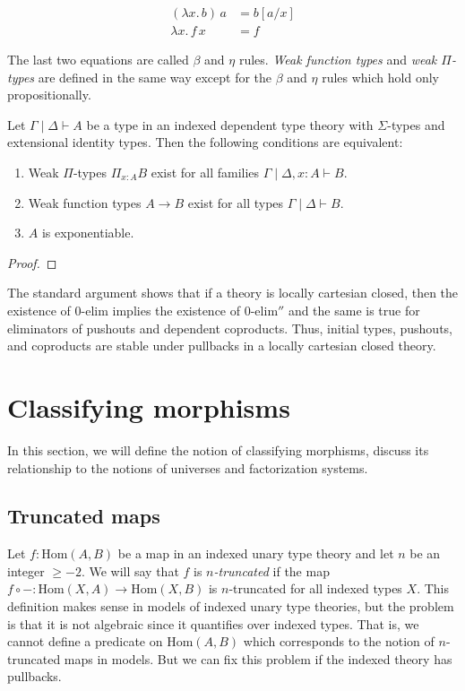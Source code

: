 \documentclass[reqno]{amsart}
\theoremstyle{definition}
\theoremstyle{remark}
\newcommand{\ob}{}
\newcommand{\fs}[1]{\mathrm{#1}}
\newcommand{\Hom}{\fs{Hom}}
\numberwithin{figure}{section}
\begin{document}
\begin{align*}
(\lambda x.\,b)\,a & = b[a/x] \\
\lambda x.\,f\,x & = f
\end{align*}

The last two equations are called $\beta$ and $\eta$ rules.
\emph{Weak function types} and \emph{weak $\Pi$-types} are defined in the same way except for the $\beta$ and $\eta$ rules which hold only propositionally.

\begin{prop}
Let $\Gamma \mid \Delta \vdash A \ob$ be a type in an indexed dependent type theory with $\Sigma$-types and extensional identity types.
Then the following conditions are equivalent:
\begin{enumerate}
\item Weak $\Pi$-types $\Pi_{x : A} B$ exist for all families $\Gamma \mid \Delta, x : A \vdash B \ob$.
\item Weak function types $A \to B$ exist for all types $\Gamma \mid \Delta \vdash B \ob$.
\item $A$ is exponentiable.
\end{enumerate}
\end{prop}
\begin{proof}
\end{proof}

The standard argument shows that if a theory is locally cartesian closed, then the existence of $0\text{-}\fs{elim}$ implies the existence of $0\text{-}\fs{elim''}$ and the same is true for eliminators of pushouts and dependent coproducts.
Thus, initial types, pushouts, and coproducts are stable under pullbacks in a locally cartesian closed theory.

\section{Classifying morphisms}

In this section, we will define the notion of classifying morphisms, discuss its relationship to the notions of universes and factorization systems.

\subsection{Truncated maps}

Let $f : \Hom(A,B)$ be a map in an indexed unary type theory and let $n$ be an integer $\geq -2$.
We will say that $f$ is \emph{$n$-truncated} if the map $f \circ - : \Hom(X,A) \to \Hom(X,B)$ is $n$-truncated for all indexed types $X$.
This definition makes sense in models of indexed unary type theories, but the problem is that it is not algebraic since it quantifies over indexed types.
That is, we cannot define a predicate on $\Hom(A,B)$ which corresponds to the notion of $n$-truncated maps in models.
But we can fix this problem if the indexed theory has pullbacks.
\end{document}
